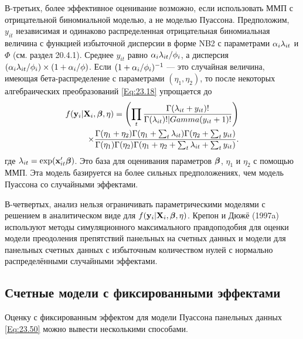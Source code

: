В-третьих, более эффективное оценивание возможно, если использовать ММП с отрицательной биномиальной моделью, а не моделью Пуассона. Предположим, $y_{it}$ независимая и одинаково распределенная отрицательная биномиальная величина с функцией избыточной дисперсии в форме NB2 с параметрами $\alpha_i\lambda_{it}$ и $\Phi$ (см. раздел 20.4.1). Среднее $y_{it}$ равно $\alpha_i \lambda_{it}/\phi_i$, а дисперсия $(\alpha_i\lambda_{it}/\phi_i) \times (1+\alpha_i/\phi)$. Если $(1+\alpha_i/\phi_i)^{-1}$ --- это случайная величина, имеющая бета-распределение с параметрами $(\eta_1, \eta_2)$, то после некоторых алгебраических преобразований \ref{Eq:23.18} упрощается до 
\begin{align}
f(\mathbf{y}_i|\mathbf{X}_i, \bm{\beta}, \eta) = 
\left( \prod_t \frac{\Gamma (\lambda_{it}+y_{it})!}{\Gamma(\lambda_{it})! |Gamma(y_{it}+1)!} \right)
\label{Eq:23.56} \\
\times \frac{\Gamma(\eta_1+\eta_2)\Gamma (\eta_1+\sum_t \lambda_{it}) \Gamma (\eta_2+\sum_t y_{it})}{\Gamma(\eta_1) \Gamma(\eta_2) \Gamma (\eta_1+\eta_2+\sum_t \lambda_{it} + \sum_t y_{it})}. \nonumber \\
\end{align}
где $\lambda_{it}=\exp (\mathbf{x}'_{it}\bm{\beta})$. Это база для оценивания параметров $\bm{\beta}$, $\eta_1$ и $\eta_2$ с помощью ММП. Эта модель базируется на более сильных предположениях, чем модель Пуассона со случайными эффектами.

В-четвертых, анализ нельзя ограничивать параметрическими моделями с решением в аналитическом виде для $f(\mathbf{y}_i|\mathbf{X}_i, \bm{\beta}, \eta)$. Крепон и Дюжё (1997a) используют методы симуляционного  максимального правдоподобия для оценки модели преодоления препятствий панельных на счетных данных и модели для панельных счетных данных с избыточным количеством нулей с нормально распределёнными случайными эффектами. 



\subsection{Счетные модели с фиксированными эффектами}

Оценку с фиксированным эффектом для модели Пуассона панельных данных \ref{Eq:23.50} можно вывести несколькими способами.

